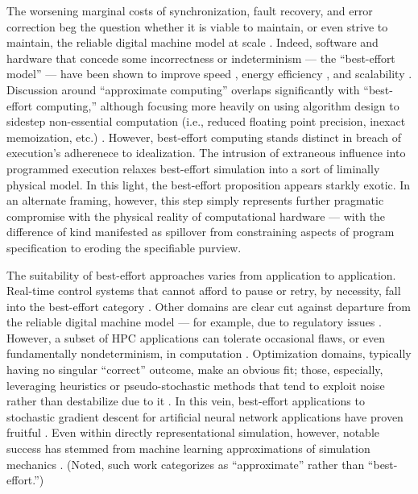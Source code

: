 The worsening marginal costs of synchronization, fault recovery, and error correction beg the question whether it is viable to maintain, or even strive to maintain, the reliable digital machine model at scale \citep{dongarra2014applied}.
Indeed, software and hardware that concede some incorrectness or indeterminism --- the ``best-effort model'' --- have been shown to improve speed \citep{chakrapani2008probabilistic}, energy efficiency \citep{chakrapani2008probabilistic,bocquet2018memory}, and scalability \citep{meng2009best}.
Discussion around ``approximate computing'' overlaps significantly with ``best-effort computing,'' although focusing more heavily on using algorithm design to sidestep non-essential computation (i.e., reduced floating point precision, inexact memoization, etc.) \citep{mittal2016survey}.
However, best-effort computing stands distinct in breach of execution's adherenece to idealization.
The intrusion of extraneous influence into programmed execution relaxes best-effort simulation into a sort of liminally physical model.
In this light, the best-effort proposition appears starkly exotic.
In an alternate framing, however, this step simply represents further pragmatic compromise with the physical reality of computational hardware --- with the difference of kind manifested as spillover from constraining aspects of program specification to eroding the specifiable purview.

The suitability of best-effort approaches varies from application to application.
Real-time control systems that cannot afford to pause or retry, by necessity, fall into the best-effort category \citep{rahmati2011computing, rhodes2020real}.
Other domains are clear cut against departure from the reliable digital machine model --- for example, due to regulatory issues \citep{dongarra2014applied}.
However, a subset of HPC applications can tolerate occasional flaws, or even fundamentally nondeterminism, in computation \citep{chakradhar2010best}.
Optimization domains, typically having no singular ``correct'' outcome, make an obvious fit;
those, especially, leveraging heuristics or pseudo-stochastic methods that tend to exploit noise rather than destabilize due to it \citep{chakrapani2008probabilistic,chakradhar2010best}.
In this vein, best-effort applications to stochastic gradient descent for artificial neural network applications have proven fruitful \citep{dean2012large,zhao2019elastic,niu2011hogwild,noel2014dogwild,rhodes2020real}.
Even within directly representational simulation, however, notable success has stemmed from machine learning approximations of simulation mechanics \citep{behler2007generalizedkochkov2021machine}.
(Noted, such work categorizes as ``approximate'' rather than ``best-effort.'')

